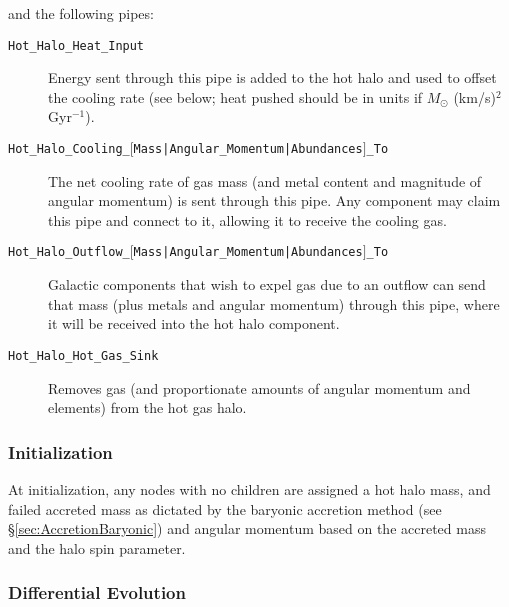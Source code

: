 and the following pipes:
\begin{description}
 \item [{\tt Hot\_Halo\_Heat\_Input}] Energy sent through this pipe is added to the hot halo and used to offset the cooling rate (see below; heat pushed should be in units if $M_\odot$ (km/s)$^2$ Gyr$^{-1}$).
 \item [{\tt Hot\_Halo\_Cooling\_$[$Mass|Angular\_Momentum|Abundances$]$\_To}] The net cooling rate of gas mass (and metal content and magnitude of angular momentum) is sent through this pipe. Any \gls{component} may claim this pipe and connect to it, allowing it to receive the cooling gas.
 \item [{\tt Hot\_Halo\_Outflow\_$[$Mass|Angular\_Momentum|Abundances$]$\_To}] Galactic components that wish to expel gas due to an outflow can send that mass (plus metals and angular momentum) through this pipe, where it will be received into the hot halo component. 
 \item [{\tt Hot\_Halo\_Hot\_Gas\_Sink}] Removes gas (and proportionate amounts of angular momentum and elements) from the hot gas halo.
\end{description}

\subsubsection{Initialization}

At initialization, any nodes with no children are assigned a hot halo mass, and failed accreted mass as dictated by the baryonic accretion method (see \S\ref{sec:AccretionBaryonic}) and angular momentum based on the accreted mass and the halo spin parameter.

\subsubsection{Differential Evolution}

